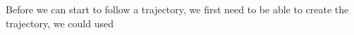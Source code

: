 Before we can start to follow a trajectory, we first need to be able to create the trajectory, we could used 